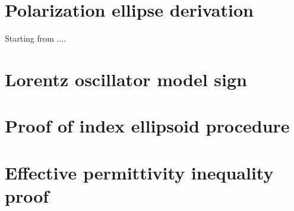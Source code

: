 \section{Polarization ellipse derivation}
\label{sec:deriv_pol_ellipse}
Starting from ....
\section{Lorentz oscillator model sign}
\label{sec:lorentz_model_sign}
\section{Proof of index ellipsoid procedure}
\label{sec:index_ellipse_proof}
\section{Effective permittivity inequality proof}
\label{sec:bf_proof}
